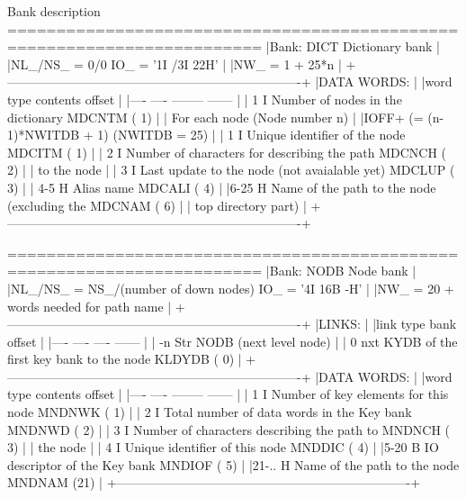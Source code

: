 \begin{XMPt}{Bank description}
========================================================================
|Bank:  DICT                                           Dictionary bank |
|NL_/NS_ =  0/0                                     IO_ = '1I /3I 22H' |
|NW_     =  1 + 25*n                                                   |
+----------------------------------------------------------------------+
|DATA WORDS:                                                           |
|word  type  contents                                      offset      |
|----  ----  --------                                      ------      |
|   1    I   Number of nodes in the dictionary             MDCNTM ( 1) |
|      For each node (Node number n)                                   |
|IOFF+      (= (n-1)*NWITDB + 1)  (NWITDB = 25)                        |
|   1    I   Unique identifier of the node                 MDCITM ( 1) |
|   2    I   Number of characters for describing the path  MDCNCH ( 2) |
|            to the node                                               |
|   3    I   Last update to the node (not avaialable yet)  MDCLUP ( 3) |
| 4-5    H   Alias name                                    MDCALI ( 4) |
|6-25    H   Name of the path to the node (excluding the   MDCNAM ( 6) |
|            top directory part)                                       |
+----------------------------------------------------------------------+


========================================================================
|Bank:  NODB                                                 Node bank |
|NL_/NS_ =  NS_/(number of down nodes)               IO_ = '4I 16B -H' |
|NW_     =  20 + words needed for path name                            |
+----------------------------------------------------------------------+
|LINKS:                                                                |
|link   type   bank                                        offset      |
|----   ----   ----                                        ------      |
| -n     Str   NODB (next level node)                                  |
|  0     nxt   KYDB of the first key bank to the node      KLDYDB ( 0) |
+----------------------------------------------------------------------+
|DATA WORDS:                                                           |
|word  type  contents                                      offset      |
|----  ----  --------                                      ------      |
|   1    I   Number of key elements for this node          MNDNWK ( 1) |
|   2    I   Total number of data words in the Key bank    MNDNWD ( 2) |
|   3    I   Number of characters describing the path to   MNDNCH ( 3) |
|            the node                                                  |
|   4    I   Unique identifier of this node                MNDDIC ( 4) |
|5-20    B   IO descriptor of the Key bank                 MNDIOF ( 5) |
|21-..   H   Name of the path to the node                  MNDNAM (21) |
+----------------------------------------------------------------------+



\end{XMPt}
